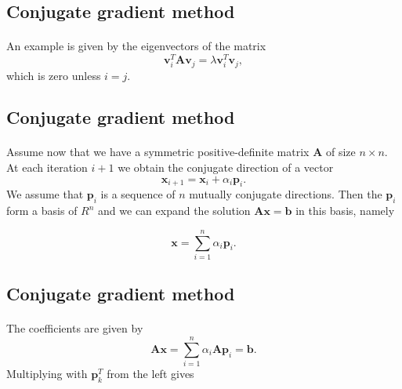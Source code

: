 \documentclass[%
oneside,                 %
final,                   %
10pt]{article}
\begin{document}
\subsection{Conjugate gradient method}

\paragraph{}
An example is given by the eigenvectors of the matrix
\begin{equation*}
\bm{v}_i^T\bm{A}\bm{v}_j= \lambda\bm{v}_i^T\bm{v}_j,
\end{equation*}
which is zero unless $i=j$.




\subsection{Conjugate gradient method}

\paragraph{}
Assume now that we have a symmetric positive-definite matrix $\bm{A}$ of size
$n\times n$. At each iteration $i+1$ we obtain the conjugate direction of a vector
\begin{equation*}
\bm{x}_{i+1}=\bm{x}_{i}+\alpha_i\bm{p}_{i}. 
\end{equation*}
We assume that $\bm{p}_{i}$ is a sequence of $n$ mutually conjugate directions. 
Then the $\bm{p}_{i}$  form a basis of $R^n$ and we can expand the solution 
$  \bm{A}\bm{x} = \bm{b}$ in this basis, namely

\begin{equation*}
  \bm{x}  = \sum^{n}_{i=1} \alpha_i \bm{p}_i.
\end{equation*}



\subsection{Conjugate gradient method}

\paragraph{}
The coefficients are given by
\begin{equation*}
    \mathbf{A}\mathbf{x} = \sum^{n}_{i=1} \alpha_i \mathbf{A} \mathbf{p}_i = \mathbf{b}.
\end{equation*}
Multiplying with $\bm{p}_k^T$  from the left gives
\end{document}
